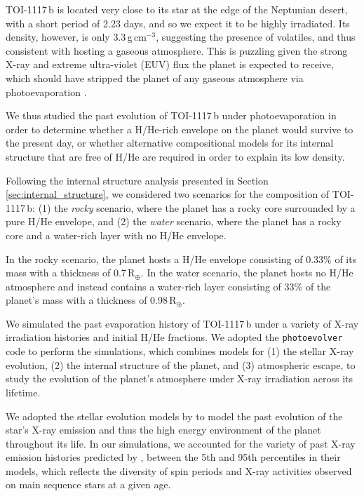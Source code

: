 \documentclass[fleqn,usenatbib,useAMS]{mnras}
\begin{document}
TOI-1117\,b is located very close to its star at the edge of the Neptunian desert, with a short period of 2.23 days, and so we expect it to be highly irradiated.
Its density, however, is only 3.3\,g\,cm$^{-3}$, suggesting the presence of volatiles, and thus consistent with hosting a gaseous atmosphere. This is puzzling given the strong X-ray and extreme ultra-violet (EUV) flux the planet is expected to receive, which should have stripped the planet of any gaseous atmosphere via photoevaporation \citep[e.g.][]{Owen17:radius-valley, Owen2018}.

We thus studied the past evolution of TOI-1117\,b under photoevaporation in order to determine whether a H/He-rich envelope on the planet would survive to the present day, or whether alternative compositional models for its internal structure that are free of H/He are required in order to explain its low density.

Following the internal structure analysis presented in Section\,\ref{sec:internal_structure}, we considered two scenarios for the composition of TOI-1117\,b: (1) the {\em rocky} scenario, where the planet has a rocky core surrounded by a pure H/He envelope, and (2) the {\em water} scenario, where the planet has a rocky core and a water-rich layer with no H/He envelope.

In the rocky scenario, the planet hosts a H/He envelope consisting of 0.33\% of its mass with a thickness of 0.7\,R$_\oplus$. In the water scenario, the planet hosts no H/He atmosphere and instead contains a water-rich layer consisting of 33\% of the planet's mass with a thickness of 0.98\,R$_\oplus$.

We simulated the past evaporation history of TOI-1117\,b under a variety of X-ray irradiation histories and initial H/He fractions.
We adopted the {\tt photoevolver} code \citep{Fernandez23:photoevolver} to perform the simulations, which combines models for (1) the stellar X-ray evolution, (2) the internal structure of the planet, and (3) atmospheric escape, to study the evolution of the planet's atmosphere under X-ray irradiation across its lifetime.

We adopted the stellar evolution models by \citet{Johnstone21:xray-evolution} to model the past evolution of the star's X-ray emission and thus the high energy environment of the planet throughout its life.
In our simulations, we accounted for the variety of past X-ray emission histories predicted by \citet{Johnstone21:xray-evolution}, between the 5th and 95th percentiles in their models, which reflects the diversity of spin periods and X-ray activities observed on main sequence stars at a given age.
\end{document}
